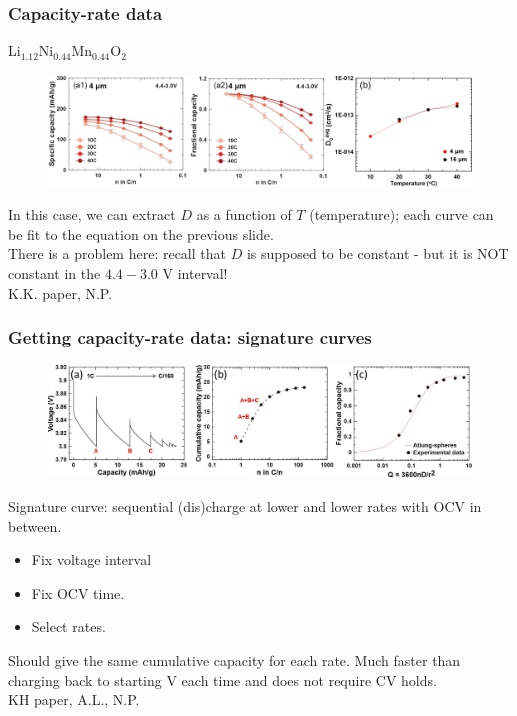 \documentclass{beamer}
\begin{document}
\begin{frame}
\frametitle{Capacity-rate data}

\begin{center} 
	Li$_{1.12}$Ni$_{0.44}$Mn$_{0.44}$O$_2$
\end{center}
\vspace{-0.5cm}
\begin{figure}
	\includegraphics[width=0.9\linewidth]{figs/cap-rate_D-T.pdf}
\end{figure}

In this case, we can extract $D$ as a function of $T$ (temperature); each curve can be fit to the equation on the previous slide. \\
There is a problem here: recall that $D$ is supposed to be constant - but it is NOT constant in the $4.4-3.0$ V interval! \\
\vspace{\baselineskip}
\footnotesize K.K. paper, N.P.

\end{frame}

\begin{frame}
\frametitle{Getting capacity-rate data: signature curves}

\begin{figure}
	\includegraphics[width=0.85\linewidth]{figs/sig_curves.pdf}
\end{figure}
\vspace{-0.5cm}
Signature curve: sequential (dis)charge at lower and lower rates with OCV in between. 
\begin{itemize}
	\item Fix voltage interval
	\item Fix OCV time.
	\item Select rates.
\end{itemize}
Should give the same cumulative capacity for each rate. Much faster than charging back to starting V each time and does not require CV holds. \\
\vspace{\baselineskip}
\footnotesize KH paper, A.L., N.P.

\end{frame}
\end{document}

